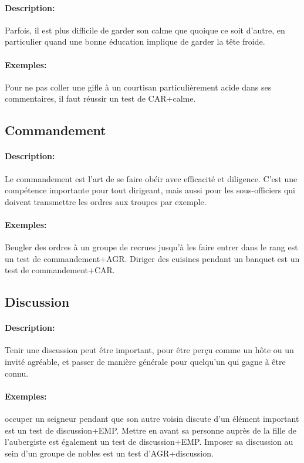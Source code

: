 \documentclass[10pt,a4paper,twocolumn]{book}
\begin{document}
\paragraph{Description:}Parfois, il est plus difficile de garder son calme que quoique ce soit d'autre, en particulier quand une bonne éducation implique de garder la tête froide.
\paragraph{Exemples:}Pour ne pas coller une gifle à un courtisan particulièrement acide dans ses commentaires, il faut réussir un test de CAR+calme.
\subsection{Commandement}
\paragraph{Description:}Le commandement est l'art de se faire obéir avec efficacité et diligence. C'est une compétence importante pour tout dirigeant, mais aussi pour les sous-officiers qui doivent transmettre les ordres aux troupes par exemple.
\paragraph{Exemples:}Beugler des ordres à un groupe de recrues jusqu'à les faire entrer dans le rang est un test de commandement+AGR. Diriger des cuisines pendant un banquet est un test de commandement+CAR.
\subsection{Discussion}
\paragraph{Description:}Tenir une discussion peut être important, pour être perçu comme un hôte ou un invité agréable, et passer de manière générale pour quelqu'un qui gagne à être connu.
\paragraph{Exemples:}occuper un seigneur pendant que son autre voisin discute d'un élément important est un test de discussion+EMP. Mettre en avant sa personne auprès de la fille de l'aubergiste est également un test de discussion+EMP. Imposer sa discussion au sein d'un groupe de nobles est un test d'AGR+discussion.
\end{document}
